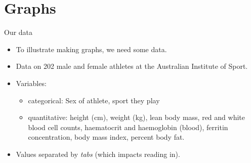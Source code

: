 \documentclass[unknownkeysallowed]{beamer}\usepackage[]{graphicx}\usepackage[]{color}
\begin{document}


\section{Graphs}

\frame{\sectionpage}

\begin{frame}[fragile]{Our data}
  
  \begin{itemize}
  \item To illustrate making graphs, we need some data.
  \item Data on 202 male and female athletes at the Australian
    Institute of Sport.
  \item Variables:
    \begin{itemize}
    \item categorical: Sex of athlete, sport they play 
    \item quantitative: height (cm), weight (kg), lean body mass, red
      and white blood cell counts, haematocrit and haemoglobin
      (blood), ferritin concentration, body mass index, percent body
      fat. 
    \end{itemize}
  \item Values separated by \emph{tabs} (which impacts reading in).

  \end{itemize}
  
\end{frame}
\end{document}

